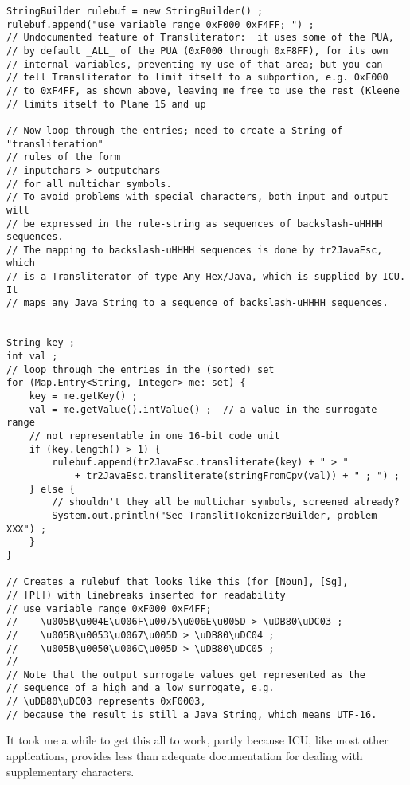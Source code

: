 \documentclass[letterpaper,12pt]{article}
\begin{document}
\begin{Verbatim}[fontsize=\footnotesize]
StringBuilder rulebuf = new StringBuilder() ;
rulebuf.append("use variable range 0xF000 0xF4FF; ") ;
// Undocumented feature of Transliterator:  it uses some of the PUA,
// by default _ALL_ of the PUA (0xF000 through 0xF8FF), for its own
// internal variables, preventing my use of that area; but you can 
// tell Transliterator to limit itself to a subportion, e.g. 0xF000
// to 0xF4FF, as shown above, leaving me free to use the rest (Kleene
// limits itself to Plane 15 and up

// Now loop through the entries; need to create a String of "transliteration"
// rules of the form
// inputchars > outputchars
// for all multichar symbols.
// To avoid problems with special characters, both input and output will
// be expressed in the rule-string as sequences of backslash-uHHHH sequences.
// The mapping to backslash-uHHHH sequences is done by tr2JavaEsc, which
// is a Transliterator of type Any-Hex/Java, which is supplied by ICU.  It
// maps any Java String to a sequence of backslash-uHHHH sequences.


String key ;
int val ;
// loop through the entries in the (sorted) set 
for (Map.Entry<String, Integer> me: set) {
    key = me.getKey() ;
    val = me.getValue().intValue() ;  // a value in the surrogate range
    // not representable in one 16-bit code unit
    if (key.length() > 1) {
        rulebuf.append(tr2JavaEsc.transliterate(key) + " > " 
            + tr2JavaEsc.transliterate(stringFromCpv(val)) + " ; ") ;
    } else {
        // shouldn't they all be multichar symbols, screened already?
        System.out.println("See TranslitTokenizerBuilder, problem XXX") ;
    }
}

// Creates a rulebuf that looks like this (for [Noun], [Sg],
// [Pl]) with linebreaks inserted for readability
// use variable range 0xF000 0xF4FF; 
//    \u005B\u004E\u006F\u0075\u006E\u005D > \uDB80\uDC03 ; 
//    \u005B\u0053\u0067\u005D > \uDB80\uDC04 ; 
//    \u005B\u0050\u006C\u005D > \uDB80\uDC05 ; 
//
// Note that the output surrogate values get represented as the
// sequence of a high and a low surrogate, e.g.
// \uDB80\uDC03 represents 0xF0003,
// because the result is still a Java String, which means UTF-16.
\end{Verbatim}

\noindent
It took me a while to get this all to work, partly because ICU, like most other
applications, provides less than adequate documentation for dealing with
supplementary characters.
\end{document}
